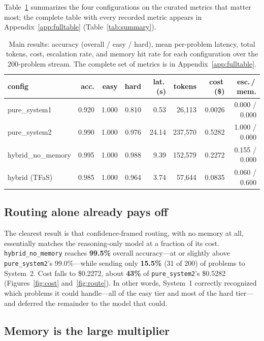 \documentclass[11pt]{article}
\newcommand{\sysone}{System~1}
\newcommand{\systwo}{System~2}
\begin{document}
Table~\ref{tab:main} summarizes the four configurations on the curated metrics
that matter most; the complete table with every recorded metric appears in
Appendix~\ref{app:fulltable} (Table~\ref{tab:summary}).

\begin{table}[H]
  \centering
  \caption{Main results: accuracy (overall / easy / hard), mean per-problem
  latency, total tokens, cost, escalation rate, and memory hit rate for each
  configuration over the 200-problem stream. The complete set of metrics is in
  Appendix~\ref{app:fulltable}.}
  \label{tab:main}
  \begin{tabular}{lrrrrrrr}
    \toprule
    \textbf{config} & \textbf{acc.} & \textbf{easy} & \textbf{hard}
      & \textbf{lat.\,(s)} & \textbf{tokens} & \textbf{cost\,(\$)}
      & \textbf{esc.\,/\,mem.} \\
    \midrule
    pure\_system1     & 0.920 & 1.000 & 0.810 &  0.53 &  26{,}113 & 0.0026 & 0.000 / 0.000 \\
    pure\_system2     & 0.990 & 1.000 & 0.976 & 24.14 & 237{,}570 & 0.5282 & 1.000 / 0.000 \\
    hybrid\_no\_memory & 0.995 & 1.000 & 0.988 &  9.39 & 152{,}579 & 0.2272 & 0.155 / 0.000 \\
    hybrid (TFaS)     & 0.985 & 1.000 & 0.964 &  3.74 &  57{,}644 & 0.0835 & 0.060 / 0.600 \\
    \bottomrule
  \end{tabular}
\end{table}

\subsection{Routing alone already pays off}

The clearest result is that confidence-framed routing, with no memory at all,
essentially matches the reasoning-only model at a fraction of its cost.
\texttt{hybrid\_no\_memory} reaches \textbf{99.5\%} overall accuracy---at or
slightly above \texttt{pure\_system2}'s 99.0\%---while sending only \textbf{15.5\%}
(31 of 200) of problems to \systwo. Cost falls to \$0.2272, about \textbf{43\%}
of \texttt{pure\_system2}'s \$0.5282 (Figures~\ref{fig:cost}
and~\ref{fig:route}). In other words, \sysone{} correctly recognized which
problems it could handle---all of the easy tier and most of the hard tier---and
deferred the remainder to the model that could.

\subsection{Memory is the large multiplier}
\end{document}
